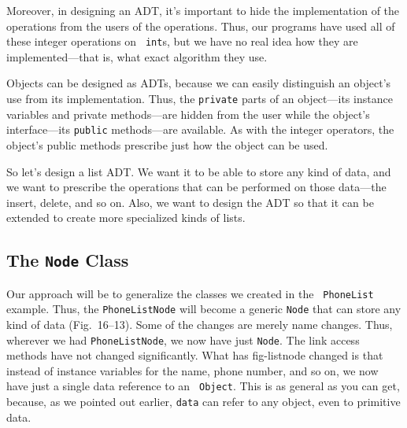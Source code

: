 Moreover, in designing an ADT, it's important to hide the
implementation of the operations from the users of the operations.
Thus, our programs have used all of these integer operations on {\tt
int}s, but we have no real idea how they are implemented---that is,
what exact algorithm they use.

Objects can be designed as ADTs, because we can easily
distinguish an object's use from its implementation.  Thus, the
{\tt private} parts of an object---its instance variables and private
methods---are hidden from the user while the object's interface---its 
{\tt public} methods---are available.  As with the integer
operators, the object's public methods prescribe just how the object
can be used.

So let's design a list ADT. We want it to be able to store any kind of
data, and we want to prescribe the operations that can be performed on
those data---the insert, delete, and so on.  Also, we want to design
the ADT so that it can be extended to create more specialized
kinds of lists.

\subsection*{The {\tt Node} Class}


\noindent Our approach will be to generalize the classes we created in the {\tt
Phone\-List} example.  Thus, the {\tt PhoneListNode} will become a
generic {\tt Node} that can store any kind of data
(Fig.~16--13).  Some of the changes are merely name changes.
Thus, wherever we had {\tt PhoneListNode}, we now have just {\tt Node}.
The link access methods have not changed significantly.  What has
{fig-listnode}
changed is that instead of instance variables for the name, phone
number, and so on, we now have just a single data reference to an {\tt
Object}. This is as general as you can get, because, as we pointed out
earlier, {\tt data} can refer to any object, even to
primitive data.

